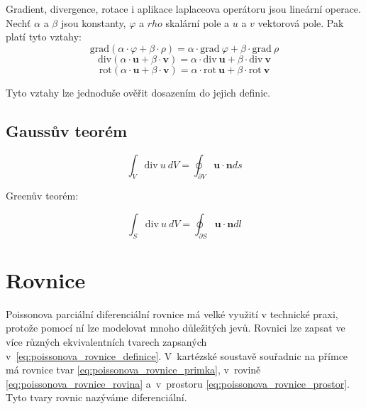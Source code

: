 \documentclass{book}
\newcommand{\vect}[1]{\boldsymbol{#1}}
\newcommand{\grad}{\mathrm{grad}}
\newcommand{\diverg}{\mathrm{div}}
\newcommand{\rot}{\mathrm{rot}}
\begin{document}
Gradient, divergence, rotace i aplikace laplaceova operátoru jsou lineární operace. Nechť \(\alpha\) a \(\beta\) jsou konstanty, \(\varphi\) a \(rho\) skalární pole a \(u\) a \(v\) vektorová pole. Pak platí tyto vztahy:
\[
\grad(\alpha \cdot \varphi + \beta \cdot \rho) = \alpha \cdot \grad \ \varphi + \beta \cdot \grad \ \rho
\]
\[
\diverg(\alpha \cdot \vect{u} + \beta \cdot \vect{v}) = \alpha \cdot \diverg \ \vect{u} + \beta \cdot \diverg \ \vect{v}
\]
\[
\rot(\alpha \cdot \vect{u} + \beta \cdot \vect{v}) = \alpha \cdot \rot \ \vect{u} + \beta \cdot \rot \ \vect{v}
\]

Tyto vztahy lze jednoduše ověřit dosazením do jejich definic.



\subsection{Gaussův teorém}

\begin{equation}
\int_V \diverg \ u \ dV = \oint_{\partial V} \vect{u} \cdot \vect{n} ds
\end{equation}


Greenův teorém:

\begin{equation}
\int_S \diverg \ u \ dV = \oint_{\partial S} \vect{u} \cdot \vect{n} dl
\end{equation}

\section{Rovnice}

Poissonova parciální diferenciální rovnice má velké využití v technické praxi, protože pomocí ní lze modelovat mnoho důležitých jevů.
Rovnici lze zapsat ve více různých ekvivalentních tvarech zapsaných v~\eqref{eq:poissonova_rovnice_definice}. V~kartézské soustavě souřadnic na přímce má rovnice tvar \eqref{eq:poissonova_rovnice_primka}, v~rovině
\eqref{eq:poissonova_rovnice_rovina} a~v~prostoru \eqref{eq:poissonova_rovnice_prostor}. Tyto tvary rovnic nazýváme diferenciální.
\end{document}
